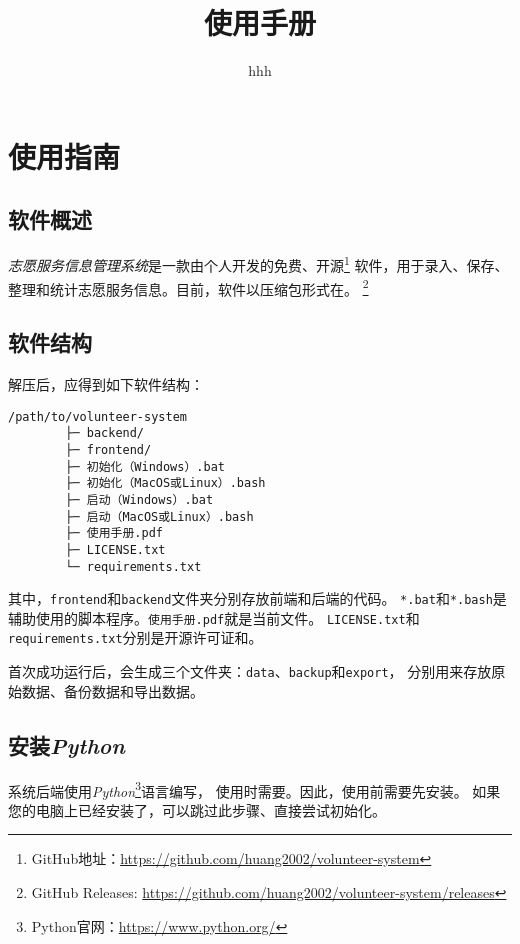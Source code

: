\documentclass[12pt,titlepage]{article}
\title{\systemname\\使用手册\\\systemversion}
\author{hhh}
\newcommand{\systemname}{志愿服务信息管理系统}
\newcommand{\githuburl}{https://github.com/huang2002/volunteer-system}
\newcommand{\releasesurl}{\githuburl/releases}
\newcommand{\Python}{\textit{Python}}
\newcommand{\GitHub}{\textit{GitHub}}
\begin{document}
 \sloppy

\maketitle

\tableofcontents
\thispagestyle{empty}
\setcounter{page}{0}

\pagestyle{headings}

\newpage
\section{使用指南}

\subsection{软件概述}

\textit{\systemname}是一款由个人开发的免费、开源\footnote{GitHub地址：\url{\githuburl}}
软件，用于录入、保存、整理和统计志愿服务信息。目前，软件以压缩包形式在。
\footnote{GitHub Releases: \url{\releasesurl}}

\subsection{软件结构}

解压后，应得到如下软件结构：

\begin{verbatim}
/path/to/volunteer-system
        ├─ backend/
        ├─ frontend/
        ├─ 初始化（Windows）.bat
        ├─ 初始化（MacOS或Linux）.bash
        ├─ 启动（Windows）.bat
        ├─ 启动（MacOS或Linux）.bash
        ├─ 使用手册.pdf
        ├─ LICENSE.txt
        └─ requirements.txt
\end{verbatim}

其中，\texttt{frontend}和\texttt{backend}文件夹分别存放前端和后端的代码。
\texttt{*.bat}和\texttt{*.bash}是辅助使用的脚本程序。\texttt{使用手册.pdf}就是当前文件。
\texttt{LICENSE.txt}和\texttt{requirements.txt}分别是开源许可证和。

首次成功运行后，会生成三个文件夹：\texttt{data}、\texttt{backup}和\texttt{export}，
分别用来存放原始数据、备份数据和导出数据。

\subsection{安装\Python}
\label{sec:install-python}

系统后端使用\Python\footnote{Python官网：\url{https://www.python.org/}}语言编写，
使用时需要。因此，使用前需要先安装。
如果您的电脑上已经安装了，可以跳过此步骤、直接尝试初始化。
\end{document}
